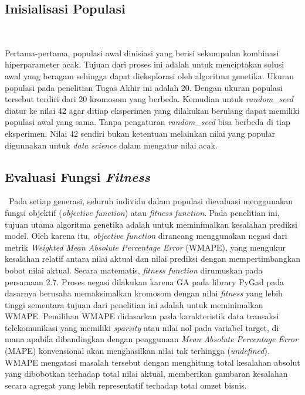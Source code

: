     \subsection{Inisialisasi Populasi}\label{sec:method construction}\
    
    Pertama-pertama, populasi awal dinisiasi yang berisi sekumpulan kombinasi hiperparameter acak. Tujuan dari proses ini adalah untuk menciptakan solusi awal yang beragam sehingga dapat dieksplorasi oleh algoritma genetika. Ukuran populasi pada penelitian Tugas Akhir ini adalah 20. Dengan ukuran populasi tersebut terdiri dari 20 kromosom yang berbeda. Kemudian untuk \textit{random\_seed} diatur ke nilai 42 agar ditiap eksperimen yang dilakukan berulang dapat memiliki populasi awal yang sama. Tanpa pengaturan \textit{random\_seed} bisa berbeda di tiap eksperimen. Nilai 42 sendiri bukan ketentuan melainkan nilai yang popular digunnakan untuk \textit{data science} dalam mengatur nilai acak.

    \subsection{Evaluasi Fungsi \textit{Fitness}}\label{sec:method construction}\
    Pada setiap generasi, seluruh individu dalam populasi dievaluasi menggunakan fungsi objektif (\textit{objective function}) atau \textit{fitness function}. Pada penelitian ini, tujuan utama algoritma genetika adalah untuk meminimalkan kesalahan prediksi model. Oleh karena itu, \textit{objective function} dirancang menggunakan negasi dari metrik \textit{Weighted Mean Absolute Percentage Error} (WMAPE), yang mengukur kesalahan relatif antara nilai aktual dan nilai prediksi dengan mempertimbangkan bobot nilai aktual. Secara matematis, \textit{fitness function} dirumuskan pada persamaan 2.7. Proses negasi dilakukan karena GA pada library PyGad pada dasarnya berusaha memaksimalkan kromosom dengan nilai \textit{fitness} yang lebih tinggi sementara tujuan dari penelitian ini adalah untuk meminimalkan WMAPE. Pemilihan WMAPE didasarkan pada karakteristik data transaksi telekomunikasi yang memiliki \textit{sparsity} atau nilai nol pada variabel target, di mana apabila dibandingkan dengan penggunaan \textit{Mean Absolute Percentage Error} (MAPE) konvensional akan menghasilkan nilai tak terhingga (\textit{undefined}). WMAPE mengatasi masalah tersebut dengan menghitung total kesalahan absolut yang dibobotkan terhadap total nilai aktual, memberikan gambaran kesalahan secara agregat yang lebih representatif terhadap total omzet bisnis. 

